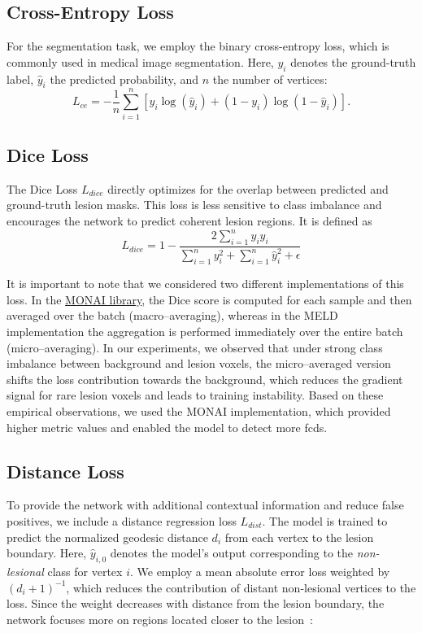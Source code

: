\documentclass[FCD_GNN.tex]{subfiles}
\begin{document}
\subsection*{Cross-Entropy Loss}
For the segmentation task, we employ the binary cross-entropy loss, which is commonly used in medical image segmentation. Here, $y_i$ denotes the ground-truth label, $\hat{y}_i$ the predicted probability, and $n$ the number of vertices:
\begin{equation}
L_{ce} = - \frac{1}{n} \sum_{i=1}^{n} 
\left[ y_i \log(\hat{y}_i) + (1-y_i)\log(1-\hat{y}_i) \right].
\end{equation}

\subsection*{Dice Loss}
The Dice Loss $L_{dice}$ directly optimizes for the overlap between predicted and ground-truth lesion masks. This loss is less sensitive to class imbalance and encourages the network to predict coherent lesion regions. It is defined as
\begin{equation}
L_{dice} = 1 - \frac{2 \sum_{i=1}^n y_i \hat{y}_i}{\sum_{i=1}^n y_i^2 + \sum_{i=1}^n \hat{y}_i^2 + \epsilon}
\end{equation}

It is important to note that we considered two different implementations of this loss. 
In the \href{https://docs.monai.io/en/stable/losses.html}{MONAI library}, the Dice score is computed for each sample and then averaged over the batch (macro--averaging), 
whereas in the MELD implementation the aggregation is performed immediately over the entire batch (micro--averaging). 
In our experiments, we observed that under strong class imbalance between background and lesion voxels, the micro--averaged version shifts the loss contribution towards the background, 
which reduces the gradient signal for rare lesion voxels and leads to training instability. 
Based on these empirical observations, we used the MONAI implementation, which provided higher metric values and enabled the model to detect more \ac{fcd}s.

\subsection*{Distance Loss}
To provide the network with additional contextual information and reduce false positives, we include a distance regression loss $L_{dist}$. 
The model is trained to predict the normalized geodesic distance \( d_i \) from each vertex to the lesion boundary. 
Here, \( \hat{y}_{i,0} \) denotes the model’s output corresponding to the \emph{non-lesional} class for vertex \( i \). 
We employ a mean absolute error loss weighted by $(d_i + 1)^{-1}$, which reduces the contribution of distant non-lesional vertices to the loss. Since the weight
decreases with distance from the lesion boundary, the network focuses more on regions located closer to the lesion~\cite{Ripart2025MELD}:
\end{document}
